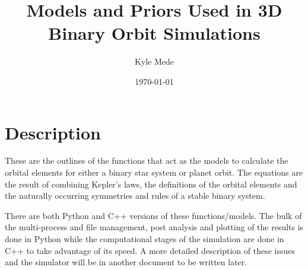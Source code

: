 \documentclass[10pt,preprint]{aastex}
\title{Models and Priors Used in 3D Binary Orbit Simulations}
\author{Kyle Mede}
\date{\today}
\begin{document}
\maketitle


\tableofcontents


\section{Description}

These are the outlines of the functions that act as the models to calculate the orbital elements for either a binary star system or planet orbit.  The equations are the result of combining Kepler's laws, the definitions of the orbital elements and the naturally occurring symmetries and rules of a stable binary system.

There are both Python and C++ versions of these functions/models.  The bulk of the multi-process and file management,  post analysis and plotting of the results is done in Python while the computational stages of the simulation are done in C++ to take advantage of its speed.  A more detailed description of these issues and the simulator will be in another document to be written later.





\end{document}
